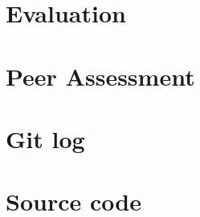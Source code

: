 \documentclass[titlepage]{article}
\begin{document}
\section{Evaluation}
	

\section{Peer Assessment}
	
	



\appendix
\section{Git log}

\section{Source code}

\end{document}
